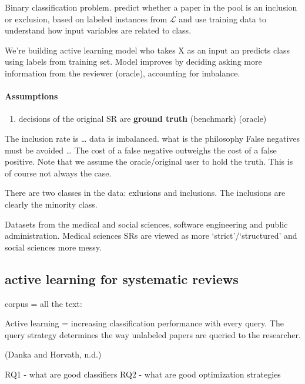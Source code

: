 \documentclass[
]{article}
\providecommand{\tightlist}{%
  \setlength{\itemsep}{0pt}\setlength{\parskip}{0pt}}
\begin{document}
Binary classification problem. predict whether a paper in the pool is an
inclusion or exclusion, based on labeled instances from \(\mathcal{L}\)
and use training data to understand how input variables are related to
class.

We're building active learning model who takes X as an input an predicts
class using labels from training set. Model improves by deciding asking
more information from the reviewer (oracle), accounting for imbalance.

\hypertarget{assumptions}{%
\paragraph{Assumptions}\label{assumptions}}

\begin{enumerate}
\def\labelenumi{\arabic{enumi})}
\tightlist
\item
  decisions of the original SR are \textbf{ground truth} (benchmark)
  (oracle)
\end{enumerate}

The inclusion rate is \ldots{} data is imbalanced. what is the
philosophy False negatives must be avoided \ldots{} The cost of a false
negative outweighs the cost of a false positive. Note that we assume the
oracle/original user to hold the truth. This is of course not always the
case.

There are two classes in the data: exlusions and inclusions. The
inclusions are clearly the minority class.

Datasets from the medical and social sciences, software engineering and
public administration. Medical sciences SRs are viewed as more
`strict'/`structured' and social sciences more messy.

\hypertarget{active-learning-for-systematic-reviews}{%
\subsection{active learning for systematic
reviews}\label{active-learning-for-systematic-reviews}}

corpus = all the text:

Active learning = increasing classification performance with every
query. The query strategy determines the way unlabeled papers are
queried to the researcher.

(Danka and Horvath, n.d.)

RQ1 - what are good classifiers RQ2 - what are good optimization
strategies
\end{document}
